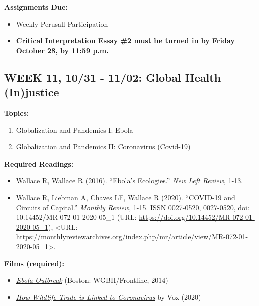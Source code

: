 \documentclass[11pt,]{article}
\providecommand{\tightlist}{%
  \setlength{\itemsep}{0pt}\setlength{\parskip}{0pt}}
\begin{document}
\textbf{Assignments Due:}

\begin{itemize}
\tightlist
\item
  Weekly Perusall Participation
\item
  \textbf{Critical Interpretation Essay \#2 must be turned in by Friday
  October 28, by 11:59 p.m.}
\end{itemize}

\bigbreak

\hypertarget{week-11-1031---1102-global-health-injustice}{%
\subsection{WEEK 11, 10/31 - 11/02: Global Health
(In)justice}\label{week-11-1031---1102-global-health-injustice}}

\textbf{Topics:}

\begin{enumerate}
\def\labelenumi{(\arabic{enumi})}
\tightlist
\item
  Globalization and Pandemics I: Ebola
\item
  Globalization and Pandemics II: Coronavirus (Covid-19)
\end{enumerate}

\textbf{Required Readings:}

\begin{itemize}
\item
  Wallace R, Wallace R (2016). ``Ebola's Ecologies.'' \emph{New Left
  Review}, 1-13.
\item
  Wallace R, Liebman A, Chaves LF, Wallace R (2020). ``COVID-19 and
  Circuits of Capital.'' \emph{Monthly Review}, 1-15. ISSN 0027-0520,
  0027-0520, doi: 10.14452/MR-072-01-2020-05\_1 (URL:
  \url{https://doi.org/10.14452/MR-072-01-2020-05_1}), \textless URL:
  \url{https://monthlyreviewarchives.org/index.php/mr/article/view/MR-072-01-2020-05_1}\textgreater.
\end{itemize}

\textbf{Films (required):}

\begin{itemize}
\tightlist
\item
  \href{https://www.pbs.org/wgbh/frontline/documentary/ebola-outbreak/}{\emph{Ebola
  Outbreak}} (Boston: WGBH/Frontline, 2014)
\item
  \href{https://www.youtube.com/watch?v=TPpoJGYlW54}{\emph{How Wildlife
  Trade is Linked to Coronavirus}} by Vox (2020)
\end{itemize}
\end{document}
